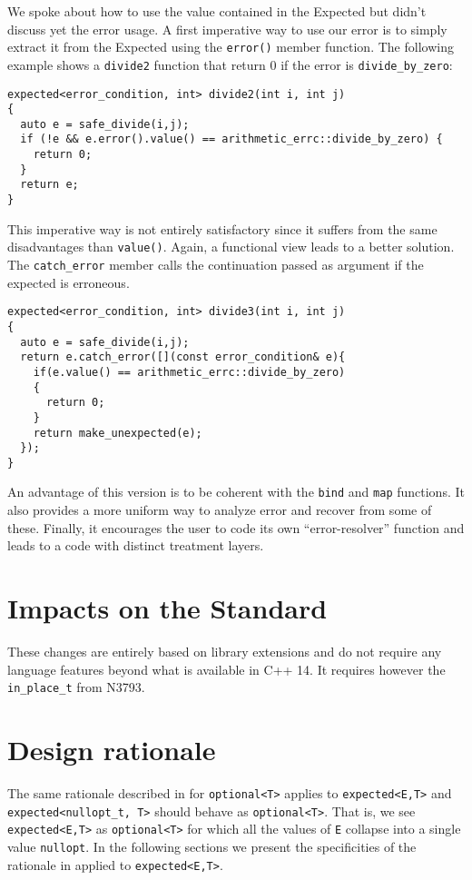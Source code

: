 \documentclass[a4paper,10pt]{article}
\newcommand{\cpp}[1]{\lstinline{#1}}
\begin{document}
We spoke about how to use the value contained in the Expected but didn't discuss yet the error usage. A first imperative way to use our error is to simply extract it from the Expected using the \cpp{error()} member function. The following example shows a \cpp{divide2} function that return 0 if the error is \cpp{divide_by_zero}:

\begin{lstlisting}
expected<error_condition, int> divide2(int i, int j)
{
  auto e = safe_divide(i,j);
  if (!e && e.error().value() == arithmetic_errc::divide_by_zero) {
    return 0;
  }
  return e;
}
\end{lstlisting}

This imperative way is not entirely satisfactory since it suffers from the same disadvantages than \cpp{value()}. Again, a functional view leads to a better solution. The \cpp{catch_error} member calls the continuation passed as argument if the expected is erroneous.

\begin{lstlisting}
expected<error_condition, int> divide3(int i, int j)
{
  auto e = safe_divide(i,j);
  return e.catch_error([](const error_condition& e){
    if(e.value() == arithmetic_errc::divide_by_zero)
    {
      return 0;
    }
    return make_unexpected(e);
  });
}
\end{lstlisting}

An advantage of this version is to be coherent with the \cpp{bind} and \cpp{map} functions. It also provides a more uniform way to analyze error and recover from some of these. Finally, it encourages the user to code its own ``error-resolver'' function and leads to a code with distinct treatment layers.

\section{Impacts on the Standard}

These changes are entirely based on library extensions and do not require any language features beyond what is available in C++ 14. It requires however the \cpp{in_place_t} from N3793.

\section{Design rationale}

The same rationale described in \cite{OptionalRev4} for \cpp{optional<T>} applies to \cpp{expected<E,T>} and \cpp{expected<nullopt_t, T>} should behave as \cpp{optional<T>}.  That is, we see \cpp{expected<E,T>} as \cpp{optional<T>} for which all the values of \cpp{E} collapse into a single value \cpp{nullopt}. In the following sections we present the specificities of the rationale in \cite{OptionalRev4} applied to  \cpp{expected<E,T>}.
\end{document}

